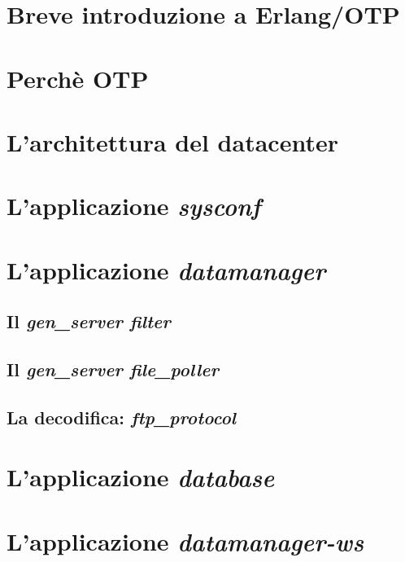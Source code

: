 %
\section{Breve introduzione a Erlang/OTP}%

\section{Perch\`e OTP}


\section{L'architettura del datacenter}
\label{datacenter-arch}
\section{L'applicazione \emph{sysconf}}
\section{L'applicazione \emph{datamanager}}
\subsection{Il \emph{gen\_server filter}}
\subsection{Il \emph{gen\_server file\_poller}}
\subsection{La decodifica: \emph{ftp\_protocol}}
\section{L'applicazione \emph{database}}
\section{L'applicazione \emph{datamanager-ws}}

